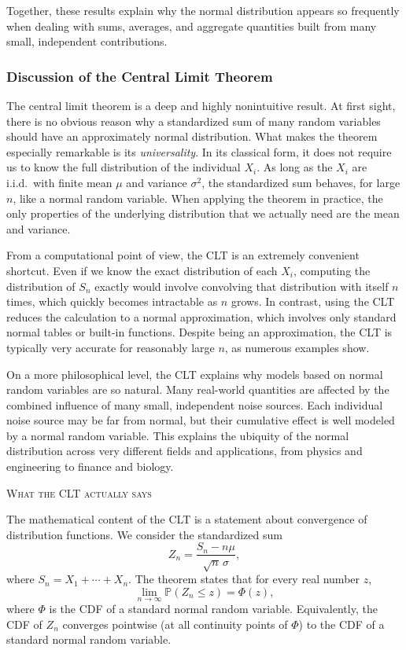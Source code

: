 Together, these results explain why the normal distribution appears so frequently when dealing with sums, averages, and aggregate quantities built from many small, independent contributions.


\subsubsection{Discussion of the Central Limit Theorem}

The central limit theorem is a deep and highly nonintuitive result.  
At first sight, there is no obvious reason why a standardized sum of many random variables should have an approximately normal distribution.  
What makes the theorem especially remarkable is its \textit{universality}.  
In its classical form, it does not require us to know the full distribution of the individual \(X_i\).  
As long as the \(X_i\) are i.i.d.\ with finite mean \(\mu\) and variance \(\sigma^2\), the standardized sum behaves, for large \(n\), like a normal random variable.  
When applying the theorem in practice, the only properties of the underlying distribution that we actually need are the mean and variance.

From a computational point of view, the CLT is an extremely convenient shortcut.  
Even if we know the exact distribution of each \(X_i\), computing the distribution of \(S_n\) exactly would involve convolving that distribution with itself \(n\) times, which quickly becomes intractable as \(n\) grows.  
In contrast, using the CLT reduces the calculation to a normal approximation, which involves only standard normal tables or built-in functions.  
Despite being an approximation, the CLT is typically very accurate for reasonably large \(n\), as numerous examples show.

On a more philosophical level, the CLT explains why models based on normal random variables are so natural.  
Many real-world quantities are affected by the combined influence of many small, independent noise sources.  
Each individual noise source may be far from normal, but their cumulative effect is well modeled by a normal random variable.  
This explains the ubiquity of the normal distribution across very different fields and applications, from physics and engineering to finance and biology.

\bigskip
\textsc{What the CLT actually says}

The mathematical content of the CLT is a statement about convergence of distribution functions.  
We consider the standardized sum
\[
Z_n
=
\frac{S_n - n\mu}{\sqrt{n}\,\sigma},
\]
where \(S_n = X_1 + \cdots + X_n\).  
The theorem states that for every real number \(z\),
\[
\lim_{n \to \infty} \mathbb{P}(Z_n \leq z)
=
\Phi(z),
\]
where \(\Phi\) is the CDF of a standard normal random variable.  
Equivalently, the CDF of \(Z_n\) converges pointwise (at all continuity points of \(\Phi\)) to the CDF of a standard normal random variable.

